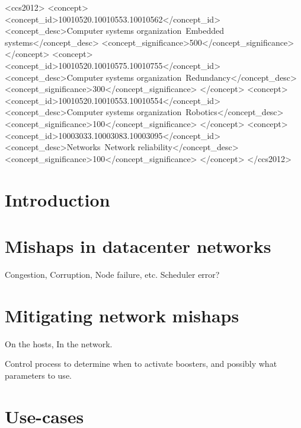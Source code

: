 \documentclass[sigconf]{acmart}
\begin{document}
%
%
\begin{CCSXML}
<ccs2012>
 <concept>
  <concept_id>10010520.10010553.10010562</concept_id>
  <concept_desc>Computer systems organization~Embedded systems</concept_desc>
  <concept_significance>500</concept_significance>
 </concept>
 <concept>
  <concept_id>10010520.10010575.10010755</concept_id>
  <concept_desc>Computer systems organization~Redundancy</concept_desc>
  <concept_significance>300</concept_significance>
 </concept>
 <concept>
  <concept_id>10010520.10010553.10010554</concept_id>
  <concept_desc>Computer systems organization~Robotics</concept_desc>
  <concept_significance>100</concept_significance>
 </concept>
 <concept>
  <concept_id>10003033.10003083.10003095</concept_id>
  <concept_desc>Networks~Network reliability</concept_desc>
  <concept_significance>100</concept_significance>
 </concept>
</ccs2012>  
\end{CCSXML}





\maketitle

\section{Introduction}
\section{Mishaps in datacenter networks}
Congestion,
Corruption,
Node failure, etc.
Scheduler error?
\section{Mitigating network mishaps}
On the hosts,
In the network.

Control process to determine when to activate boosters, and possibly what parameters to use.
\section{Use-cases}
\end{document}
